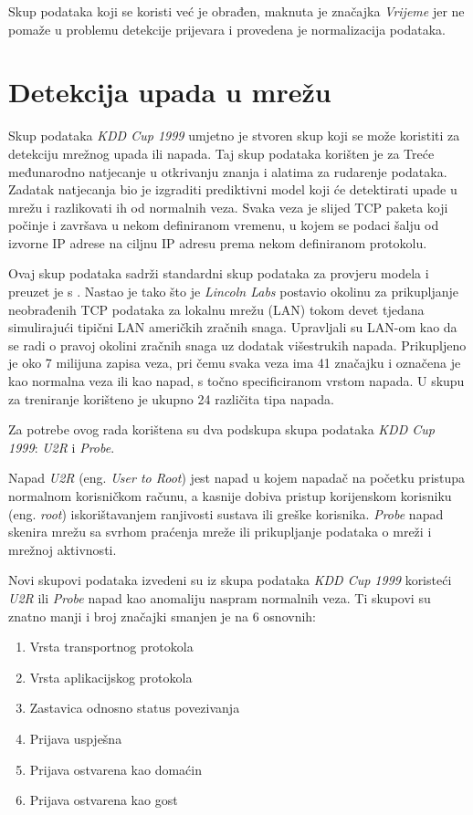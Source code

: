 \documentclass[utf8, diplomski, numeric]{fer}
\begin{document}
Skup podataka koji se koristi već je obrađen, maknuta je značajka \textit{Vrijeme} jer ne pomaže u problemu detekcije prijevara i provedena je normalizacija podataka.

\section{Detekcija upada u mrežu}
Skup podataka \textit{KDD Cup 1999} umjetno je stvoren skup koji se može koristiti za detekciju mrežnog upada ili napada. Taj skup podataka korišten je za Treće međunarodno natjecanje u otkrivanju znanja i alatima za rudarenje podataka. Zadatak natjecanja bio je izgraditi prediktivni model koji će detektirati upade u mrežu i razlikovati ih od normalnih veza. Svaka veza je slijed TCP paketa koji počinje i završava u nekom definiranom vremenu, u kojem se podaci šalju od izvorne IP adrese na ciljnu IP adresu prema nekom definiranom protokolu.

Ovaj skup podataka sadrži standardni skup podataka za provjeru modela i preuzet je s  \cite{pang2021deep}. Nastao je tako što je \textit{Lincoln Labs} postavio okolinu za prikupljanje neobrađenih TCP podataka za lokalnu mrežu (LAN) tokom devet tjedana simulirajući tipični LAN američkih zračnih snaga. Upravljali su LAN-om kao da se radi o pravoj okolini zračnih snaga uz dodatak višestrukih napada. Prikupljeno je oko 7 milijuna zapisa veza, pri čemu svaka veza ima 41 značajku i označena je kao normalna veza ili kao napad, s točno specificiranom vrstom napada. U skupu za treniranje korišteno je ukupno 24 različita tipa napada.

Za potrebe ovog rada korištena su dva podskupa skupa podataka \textit{KDD Cup 1999}: \textit{U2R} i \textit{Probe}.

Napad \textit{U2R} (eng. \textit{User to Root}) jest napad u kojem napadač na početku pristupa normalnom korisničkom računu, a kasnije dobiva pristup korijenskom korisniku (eng. \textit{root}) iskorištavanjem ranjivosti sustava ili greške korisnika. \textit{Probe} napad skenira mrežu sa svrhom praćenja mreže ili prikupljanje podataka o mreži i mrežnoj aktivnosti.

Novi skupovi podataka izvedeni su iz skupa podataka \textit{KDD Cup 1999} koristeći \textit{U2R} ili \textit{Probe} napad kao anomaliju naspram normalnih veza. Ti skupovi su znatno manji i broj značajki smanjen je na 6 osnovnih: 
\begin{enumerate}
\item Vrsta transportnog protokola
\item Vrsta aplikacijskog protokola
\item Zastavica odnosno status povezivanja
\item Prijava uspješna
\item Prijava ostvarena kao domaćin
\item Prijava ostvarena kao gost
\end{enumerate}
\end{document}
